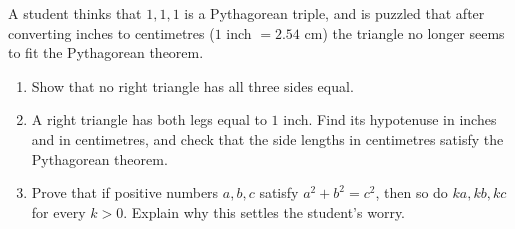 A student thinks that $1,1,1$ is a Pythagorean triple, and is puzzled that after converting inches to centimetres ($1$ inch $=2.54$ cm) the triangle no longer seems to fit the Pythagorean theorem.
\begin{enumerate}
\item[(a)] Show that no right triangle has all three sides equal.
\item[(b)] A right triangle has both legs equal to $1$ inch. Find its hypotenuse in inches and in centimetres, and check that the side lengths in centimetres satisfy the Pythagorean theorem.
\item[(c)] Prove that if positive numbers $a,b,c$ satisfy $a^2+b^2=c^2$, then so do $ka,kb,kc$ for every $k>0$. Explain why this settles the student's worry.
\end{enumerate}
